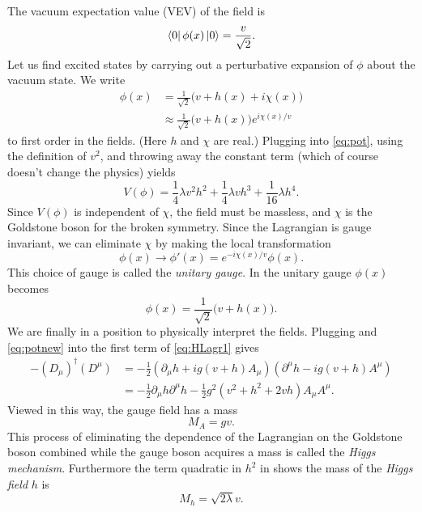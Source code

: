 The vacuum expectation value (VEV) of the field is
\begin{equation}
  \bra{0}\phi(x)\ket{0}=\frac{v}{\sqrt{2}}.
\end{equation}
Let us find excited states by carrying out a perturbative expansion of $\phi$ 
about the vacuum state. We write
\begin{equation}
  \label{eq:phixpand}
  \begin{aligned}
  \phi(x)&=\frac{1}{\sqrt{2}}\big(v+h(x)+i\chi(x)\big) \\
         &\approx\frac{1}{\sqrt{2}}\big(v+h(x)\big)
                  e^{i\chi(x)/v}
  \end{aligned}
\end{equation}
to first order in the fields. (Here $h$ and $\chi$ are real.) Plugging 
 into \eqref{eq:pot}, using the definition of 
$v^2$, and throwing away the constant term (which of course doesn't change the 
physics) yields
\begin{equation}
  \label{eq:potnew}
  V(\phi)=\frac{1}{4}\lambda v^{2}h^{2}+\frac{1}{4}\lambda vh^{3}
          +\frac{1}{16}\lambda h^{4}.
\end{equation}
Since $V(\phi)$ is independent of $\chi$, the field must be massless,
and $\chi$ is the Goldstone boson for the broken symmetry. Since the
Lagrangian is gauge invariant, we can eliminate $\chi$ by making the
local transformation
\begin{equation}
  \phi(x)\to\phi'(x)=e^{-i\chi(x)/v}\phi(x).
\end{equation}
This choice of gauge is called the {\it unitary gauge}. 
In the unitary gauge
$\phi(x)$ becomes
\begin{equation}
  \label{eq:phinew}
  \phi(x)=\frac{1}{\sqrt{2}}\big(v+h(x)\big).
\end{equation}
We are finally in a position to physically interpret the fields. Plugging 
 and \eqref{eq:potnew} into the first term of 
\eqref{eq:HLagr1} gives
\begin{equation}
  \label{eq:kin}
  \begin{aligned}
    -(D_{\mu})^{\dagger}(D^{\mu})&=-\frac{1}{2}(\partial_{\mu}h+ig(v+h)A_{\mu})
                                (\partial^{\mu}h-ig(v+h)A^{\mu}) \\
         &=-\frac{1}{2}\partial_{\mu}h\partial^{\mu}h 
           -\frac{1}{2}g^{2}(v^{2}+h^{2}+2vh)A_{\mu}A^{\mu}. 
  \end{aligned}
\end{equation} 
Viewed in this way, the gauge field has a mass
\begin{equation}
  M_{A}=gv.
\end{equation}
This process of eliminating the dependence of the Lagrangian on the Goldstone
boson combined while the gauge boson acquires a mass is called the {\it Higgs
mechanism}. Furthermore the term quadratic in 
$h^2$ in  shows the mass of the {\it Higgs field} 
$h$ is
\begin{equation}
  M_{h}=\sqrt{2\lambda}v.
\end{equation}

